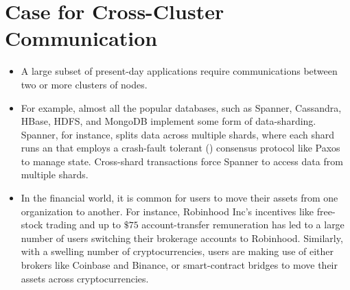 \section{Case for Cross-Cluster Communication}
\begin{itemize}[wide]
\item A large subset of present-day applications require communications 
between two or more clusters of nodes. 

\item For example, almost all the popular databases, such as Spanner, Cassandra, 
HBase, HDFS, and MongoDB implement some form of data-sharding. 
Spanner, for instance, splits data across multiple shards, where each shard runs an 
\RSM{} that employs a crash-fault tolerant (\CFT{}) consensus protocol like Paxos to 
manage state.
Cross-shard transactions force Spanner to access data from multiple shards.

\item In the financial world, it is common for users to move their assets from one 
organization to another. 
For instance, Robinhood Inc's incentives like free-stock trading and up to $\$75$ 
account-transfer remuneration has led to a large number of users switching their brokerage 
accounts to Robinhood.
Similarly, with a swelling number of cryptocurrencies, users are making use of either brokers 
like Coinbase and Binance, or smart-contract bridges to move their assets across cryptocurrencies.

\end{itemize}

